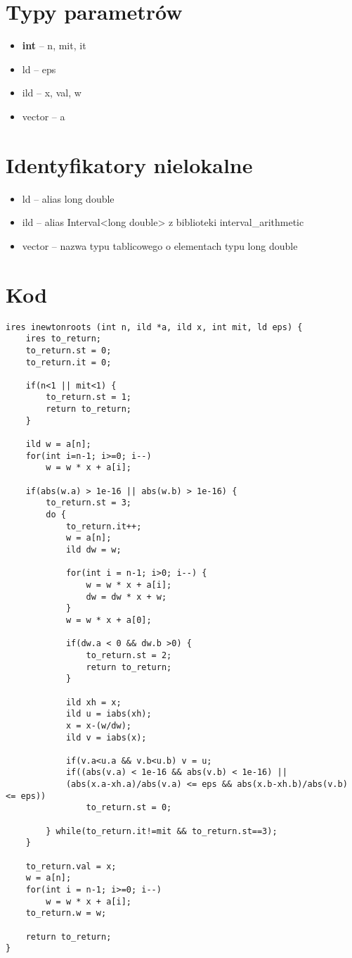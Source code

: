 \documentclass[a4paper]{article}
\begin{document}
\section{Typy parametrów}
\begin{itemize}
\item \textbf{int} -- n, mit, it
\item ld -- eps
\item ild --  x, val, w
\item vector -- a
\end{itemize}

\section{Identyfikatory nielokalne}
\begin{itemize}
\item ld -- alias long double
\item ild -- alias Interval<long double> z biblioteki interval\_arithmetic
\item vector -- nazwa typu tablicowego o elementach typu long double
\end{itemize}
\pagebreak
\section{Kod}

\begin{verbatim}
ires inewtonroots (int n, ild *a, ild x, int mit, ld eps) {
    ires to_return;
    to_return.st = 0;
    to_return.it = 0;

    if(n<1 || mit<1) {
        to_return.st = 1;
        return to_return;
    }

    ild w = a[n];
    for(int i=n-1; i>=0; i--)
        w = w * x + a[i];

    if(abs(w.a) > 1e-16 || abs(w.b) > 1e-16) {
        to_return.st = 3;
        do {
            to_return.it++;
            w = a[n];
            ild dw = w;

            for(int i = n-1; i>0; i--) {
                w = w * x + a[i];
                dw = dw * x + w;
            }
            w = w * x + a[0];

            if(dw.a < 0 && dw.b >0) {
                to_return.st = 2;
                return to_return;
            }

            ild xh = x;
            ild u = iabs(xh);
            x = x-(w/dw);
            ild v = iabs(x);

            if(v.a<u.a && v.b<u.b) v = u;
            if((abs(v.a) < 1e-16 && abs(v.b) < 1e-16) || 
            (abs(x.a-xh.a)/abs(v.a) <= eps && abs(x.b-xh.b)/abs(v.b) <= eps))
                to_return.st = 0;

        } while(to_return.it!=mit && to_return.st==3);
    }

    to_return.val = x;
    w = a[n];
    for(int i = n-1; i>=0; i--)
        w = w * x + a[i];
    to_return.w = w;

    return to_return;
}
\end{verbatim}
\end{document}
